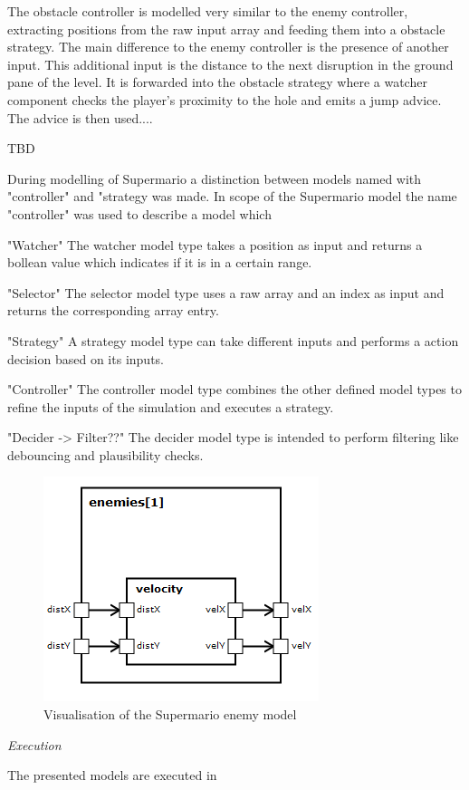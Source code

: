 The obstacle controller is modelled very similar to the enemy controller, extracting positions from the raw input array and feeding them into a obstacle strategy. The main difference to the enemy controller is the presence of another input. This additional input is the distance to the next disruption in the ground pane of the level. It is forwarded into the obstacle strategy where a watcher component checks the player's proximity to the hole and emits a jump advice. The advice is then used....

TBD



During modelling of Supermario a distinction between models named with "controller" and "strategy was made.
In scope of the Supermario model the name "controller" was used to describe a model which 

"Watcher"
The watcher model type takes a position as input and returns a bollean value which indicates if it is in a certain range.

"Selector"
The selector model type uses a raw array and an index as input and returns the corresponding array entry.

"Strategy"
A strategy model type can take different inputs and performs a action decision based on its inputs.

"Controller"
The controller model type combines the other defined model types to refine the inputs of the simulation and executes a strategy.

"Decider -> Filter??"
The decider model type is intended to perform filtering like debouncing and plausibility checks.




\begin{figure}
	\centering
	\includegraphics[scale=0.5]{pictures/haller_enemy.PNG}
	\caption{Visualisation of the Supermario enemy model}
	\label{fig:marioEnemy}
\end{figure}




\emph{Execution}

The presented models are executed in